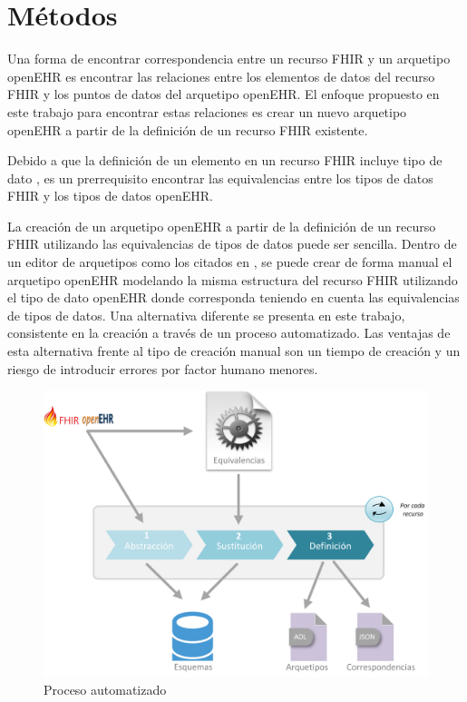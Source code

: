 \section{Métodos}

 Una forma de encontrar correspondencia entre un recurso FHIR y un arquetipo openEHR es encontrar las relaciones entre los elementos de datos del recurso FHIR y los puntos de datos del arquetipo openEHR. El enfoque propuesto en este trabajo para encontrar estas relaciones es crear un nuevo arquetipo openEHR a partir de la definición de un recurso FHIR existente.

Debido a que la definición de un elemento en un recurso FHIR incluye tipo de dato \cite{FHIRElement}, es un prerrequisito encontrar las equivalencias entre los tipos de datos FHIR y los tipos de datos openEHR.

La creación de un arquetipo openEHR a partir de la definición de un recurso FHIR utilizando las equivalencias de tipos de datos puede ser sencilla. Dentro de un editor de arquetipos como los citados en \cite{openEHRModellingTools}, se puede crear de forma manual el arquetipo openEHR modelando la misma estructura del recurso FHIR utilizando el tipo de dato openEHR donde corresponda teniendo en cuenta las equivalencias de tipos de datos. Una alternativa diferente se presenta en este trabajo, consistente en la creación a través de un proceso automatizado. Las ventajas de esta alternativa frente al tipo de creación manual son un tiempo de creación y un riesgo de introducir errores por factor humano menores.

\begin{figure}[t]
  \centering
  \includegraphics[scale=0.6]{./images/solution}
  \caption{Proceso automatizado}
  \label{fig:solution}
\end{figure}




